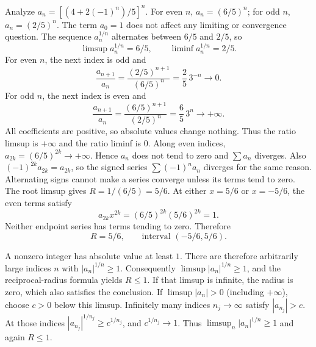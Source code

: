 \goal Analyze $a_n=[(4+2(-1)^n)/5]^n$.
For even $n$, $a_n=(6/5)^n$; for odd $n$, $a_n=(2/5)^n$.
The term $a_0=1$ does not affect any limiting or convergence question.
The sequence $a_n^{1/n}$ alternates between $6/5$ and $2/5$, so
\[
 \limsup a_n^{1/n}=6/5,\qquad \liminf a_n^{1/n}=2/5.
\]
For even $n$, the next index is odd and
\[
 \frac{a_{n+1}}{a_n}
 =\frac{(2/5)^{n+1}}{(6/5)^n}=\frac25\,3^{-n}\longrightarrow0.
\]
For odd $n$, the next index is even and
\[
 \frac{a_{n+1}}{a_n}
 =\frac{(6/5)^{n+1}}{(2/5)^n}=\frac65\,3^n\longrightarrow+\infty.
\]
All coefficients are positive, so absolute values change nothing.
Thus the ratio limsup is $+\infty$ and the ratio liminf is $0$.
Along even indices, $a_{2k}=(6/5)^{2k}\to+\infty$. Hence $a_n$
does not tend to zero and $\sum a_n$ diverges. Also
$(-1)^{2k}a_{2k}=a_{2k}$, so the signed series
$\sum(-1)^na_n$ diverges for the same reason. Alternating signs
cannot make a series converge unless its terms tend to zero.
The root limsup gives $R=1/(6/5)=5/6$. At either $x=5/6$ or
$x=-5/6$, the even terms satisfy
\[
 a_{2k}x^{2k}=(6/5)^{2k}(5/6)^{2k}=1.
\]
Neither endpoint series has terms tending to zero. Therefore
\[
 \boxed{R=5/6,\qquad\text{interval }(-5/6,5/6).}
\]

A nonzero integer has absolute value at least $1$. There are
therefore arbitrarily large indices $n$ with
$|a_n|^{1/n}\ge1$. Consequently
$\limsup|a_n|^{1/n}\ge1$, and the reciprocal-radius formula yields
$R\le1$. If that limsup is infinite, the radius is zero, which also
satisfies the conclusion.
If $\limsup|a_n|>0$ (including $+\infty$), choose $c>0$ below this
limsup. Infinitely many indices $n_j\to\infty$ satisfy $|a_{n_j}|>c$.
At those indices $|a_{n_j}|^{1/n_j}\ge c^{1/n_j}$, and
$c^{1/n_j}\to1$. Thus
$\limsup_n|a_n|^{1/n}\ge1$ and again $R\le1$.

